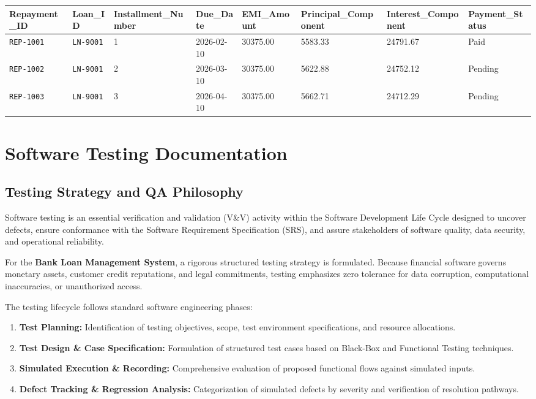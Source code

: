 \documentclass[12pt,a4paper,oneside]{report}
\begin{document}
\begin{table}[htbp]
\centering
\small
\begin{tabularx}{\textwidth}{p{2.5cm} X X X X X X X}
\toprule
\textbf{Repayment\_ID} & \textbf{Loan\_ID} & \textbf{Installment\_Number} & \textbf{Due\_Date} & \textbf{EMI\_Amount} & \textbf{Principal\_Component} & \textbf{Interest\_Component} & \textbf{Payment\_Status} \\
\midrule
\texttt{REP-1001} & \texttt{LN-9001} & 1 & 2026-02-10 & 30375.00 & 5583.33 & 24791.67 & Paid \\
\texttt{REP-1002} & \texttt{LN-9001} & 2 & 2026-03-10 & 30375.00 & 5622.88 & 24752.12 & Pending \\
\texttt{REP-1003} & \texttt{LN-9001} & 3 & 2026-04-10 & 30375.00 & 5662.71 & 24712.29 & Pending \\
\bottomrule
\end{tabularx}
\end{table}

\chapter{Software Testing Documentation}

\section{Testing Strategy and QA Philosophy}

Software testing is an essential verification and validation (V\&V) activity within the Software Development Life Cycle designed to uncover defects, ensure conformance with the Software Requirement Specification (SRS), and assure stakeholders of software quality, data security, and operational reliability.

For the \textbf{Bank Loan Management System}, a rigorous structured testing strategy is formulated. Because financial software governs monetary assets, customer credit reputations, and legal commitments, testing emphasizes zero tolerance for data corruption, computational inaccuracies, or unauthorized access.

The testing lifecycle follows standard software engineering phases:

\begin{enumerate}
  \item \textbf{Test Planning:} Identification of testing objectives, scope, test environment specifications, and resource allocations.
  \item \textbf{Test Design \& Case Specification:} Formulation of structured test cases based on Black-Box and Functional Testing techniques.
  \item \textbf{Simulated Execution \& Recording:} Comprehensive evaluation of proposed functional flows against simulated inputs.
  \item \textbf{Defect Tracking \& Regression Analysis:} Categorization of simulated defects by severity and verification of resolution pathways.
\end{enumerate}
\end{document}
